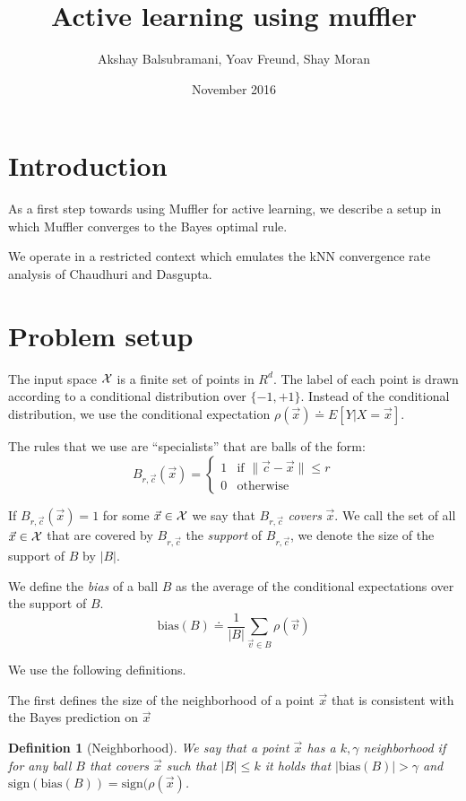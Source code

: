 \documentclass{article}
\title{Active learning using muffler}
\author{Akshay Balsubramani, Yoav Freund, Shay Moran}
\date{November 2016}
\newtheorem{definition}[theorem]{Definition}
\newcommand{\X}{{\cal X}}
\newcommand{\x}{\vec{x}}
\newcommand{\vv}{\vec{v}}
\newcommand{\cc}{\vec{c}}
\newcommand{\bias}{\text{bias}}
\newcommand{\sign}{\text{sign}}
\begin{document}
\maketitle

\section{Introduction}

As a first step towards using Muffler for active learning, we describe
a setup in which Muffler converges to the Bayes optimal rule.

We operate in a restricted context which emulates the kNN 
convergence rate analysis of Chaudhuri and Dasgupta.

\section{Problem setup}

The input space $\X$ is a finite set of points in $R^d$.
The label of each point is drawn according to a conditional
distribution over $\{-1,+1\}$. Instead of the conditional
distribution, we use the conditional expectation
$\rho(\x) \doteq E[Y | X=\x]$.

The rules that we use are ``specialists'' that are balls of the form:
\[
B_{r,\cc}(\x) =
\begin{cases}
 1 & \text{if } \| \cc- \x \| \leq r \\
 0 & \text{otherwise }
\end{cases}
\]

If $B_{r,\cc}(\x) =1$ for some $\x \in \X$ we say that $B_{r,\cc}$
{\em covers} $\x$. We call the set of all $\x \in \X$ that are covered
by $B_{r,\cc}$ the {\em support} of $B_{r,\cc}$, we denote the size of
the support of $B$ by $|B|$.

We define the {\em bias} of a ball $B$ as the average of the
conditional expectations over the support of $B$.
$$
\bias(B) \doteq \frac{1}{|B|} \sum_{\vv \in B} \rho(\vv)
$$

We use the following definitions.

The first defines the size of the neighborhood of a point $\x$ that is
consistent with the Bayes prediction on $\x$
\begin{definition}[Neighborhood]
We say that a point $\x$ has a $k,\gamma$ neighborhood if for any ball $B$ that
covers $\x$ such that $|B| \leq k$ it holds that $|\bias(B)| > \gamma$
and $\sign(\bias(B))=\sign(\rho(\x)$. 
\end{definition}
\end{document}
